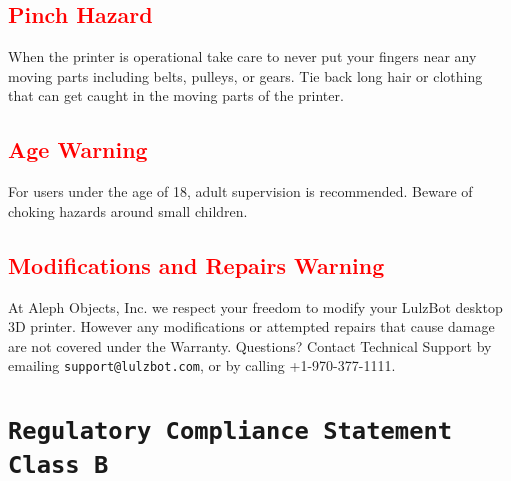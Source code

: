 \subsection{\textcolor{red}{Pinch Hazard}}

When the printer is operational take care to never put your fingers near any moving parts including belts, pulleys, or gears. Tie back long hair or clothing that can get caught in the moving parts of the printer.

\subsection{\textcolor{red}{Age Warning}}

For users under the age of 18, adult supervision is recommended. Beware of choking hazards around small children.

\subsection{\textcolor{red}{Modifications and Repairs Warning}}

At Aleph Objects, Inc. we respect your freedom to modify your LulzBot\textsuperscript{\miniscule{\textregistered}} desktop 3D printer. However any modifications or attempted repairs that cause damage are not covered under the Warranty. Questions? Contact Technical Support by emailing \texttt{support@lulzbot.com}, or by calling +1-970-377-1111.


\section{\texttt{Regulatory Compliance Statement Class B}} 
